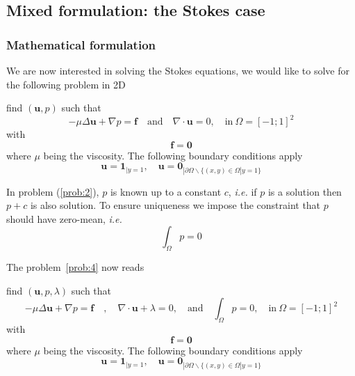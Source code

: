 \newpage

\subsection{Mixed formulation: the Stokes case}
\label{sec:mixed-form-stok}
\subsubsection{Mathematical formulation}
\label{sec:math-form}

  We are now interested in solving
the Stokes equations, we would like to solve for the following problem
in 2D
\begin{problem}
\label{prob:4}
 find $(\mathbf{u},p)$ such that
\begin{equation}
  \label{eq:22}
  - \mu \Delta \mathbf{u} +\nabla p = \mathbf{f}\quad \text{and}\quad \nabla \cdot \mathbf{u} = 0,\quad \text{in}\ \Omega = [-1;1]^2
\end{equation}
with
\begin{equation}
  \label{eq:24}
  \mathbf{f} = \mathbf{0}
\end{equation}
where $\mu$ being the viscosity. The following boundary conditions apply
\begin{equation}
  \label{eq:23}
  \mathbf{u}=\mathbf{1}_{|y=1}, \quad \mathbf{u}=\mathbf{0}_{|\partial \Omega \backslash \{(x,y) \in \Omega | y=1\}}
\end{equation}
\end{problem}

In problem (\ref{prob:2}), $p$ is known up to a constant $c$,
\emph{i.e.} if $p$ is a solution then $p+c$ is also solution. To
ensure uniqueness we impose the constraint that $p$ should have
zero-mean, \emph{i.e.}
\begin{equation}
  \label{eq:26}
  \int_\Omega p = 0
\end{equation}

The problem~\ref{prob:4} now reads
\begin{problem}
  \label{prob:5}
 find $(\mathbf{u},p,\lambda)$ such that
\begin{equation}
  \label{eq:34}
  - \mu \Delta \mathbf{u} +\nabla p = \mathbf{f}\quad, \quad \nabla \cdot \mathbf{u} + \lambda = 0, \quad \text{and}\quad \int_\Omega p = 0,\quad \text{in}\ \Omega = [-1;1]^2
\end{equation}
with
\begin{equation}
  \label{eq:35}
  \mathbf{f} = \mathbf{0}
\end{equation}
where $\mu$ being the viscosity. The following boundary conditions apply
\begin{equation}
  \label{eq:36}
  \mathbf{u}=\mathbf{1}_{|y=1}, \quad \mathbf{u}=\mathbf{0}_{|\partial \Omega \backslash \{(x,y) \in \Omega | y=1\}}
\end{equation}
\end{problem}

